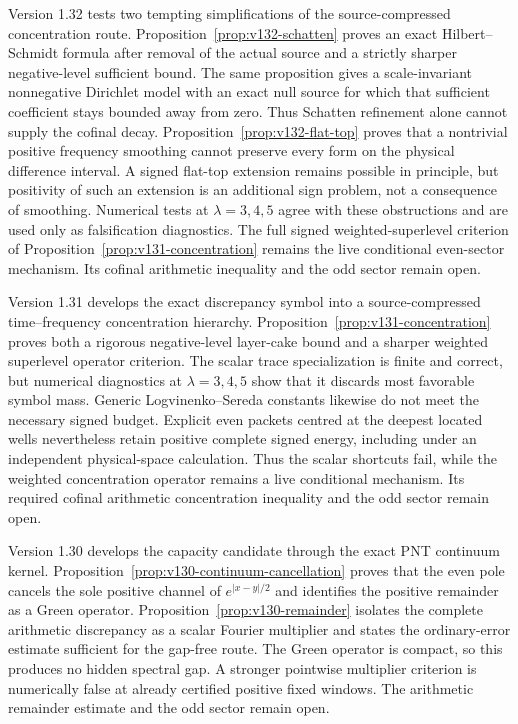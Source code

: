 \documentclass[11pt]{article}
\theoremstyle{remark}
\begin{document}
Version 1.32 tests two tempting simplifications of the source-compressed
concentration route.  Proposition~\ref{prop:v132-schatten} proves an
exact Hilbert--Schmidt formula after removal of the actual source and a
strictly sharper negative-level sufficient bound.  The same proposition
gives a scale-invariant nonnegative Dirichlet model with an exact null
source for which that sufficient coefficient stays bounded away from
zero.  Thus Schatten refinement alone cannot supply the cofinal decay.
Proposition~\ref{prop:v132-flat-top} proves that a nontrivial positive
frequency smoothing cannot preserve every form on the physical
difference interval.  A signed flat-top extension remains possible in
principle, but positivity of such an extension is an additional sign
problem, not a consequence of smoothing.  Numerical tests at
$\lambda=3,4,5$ agree with these obstructions and are used only as
falsification diagnostics.  The full signed weighted-superlevel
criterion of Proposition~\ref{prop:v131-concentration} remains the live
conditional even-sector mechanism.  Its cofinal arithmetic inequality
and the odd sector remain open.

Version 1.31 develops the exact discrepancy symbol into a
source-compressed time--frequency concentration hierarchy.
Proposition~\ref{prop:v131-concentration} proves both a rigorous
negative-level layer-cake bound and a sharper weighted superlevel
operator criterion. The scalar trace specialization is finite and
correct, but numerical diagnostics at $\lambda=3,4,5$ show that it
discards most favorable symbol mass. Generic Logvinenko--Sereda
constants likewise do not meet the necessary signed budget. Explicit
even packets centred at the deepest located wells nevertheless retain
positive complete signed energy, including under an independent
physical-space calculation. Thus the scalar shortcuts fail, while the
weighted concentration operator remains a live conditional mechanism.
Its required cofinal arithmetic concentration inequality and the odd
sector remain open.

Version 1.30 develops the capacity candidate through the exact PNT
continuum kernel. Proposition~\ref{prop:v130-continuum-cancellation}
proves that the even pole cancels the sole positive channel of
$e^{|x-y|/2}$ and identifies the positive remainder as a Green
operator. Proposition~\ref{prop:v130-remainder} isolates the complete
arithmetic discrepancy as a scalar Fourier multiplier and states the
ordinary-error estimate sufficient for the gap-free route. The Green
operator is compact, so this produces no hidden spectral gap. A
stronger pointwise multiplier criterion is numerically false at already
certified positive fixed windows.
The arithmetic remainder estimate and the odd sector remain open.
\end{document}

